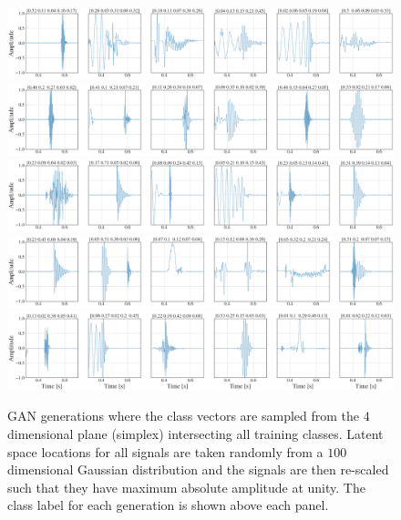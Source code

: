 \documentclass[12pt]{iopart}
\newcommand{\ndimensional}[1]{$#1$\nobreakdash\discretionary{-}{-}{-}dimensional}
\begin{document}
\begin{figure}
    \centering
    \includegraphics[width=\textwidth]{figures/generations/simplex_sample1.png}
    \includegraphics[width=\textwidth]{figures/generations/simplex_sample2.png}
    \includegraphics[width=\textwidth]{figures/generations/simplex_sample3.png}
    \includegraphics[width=\textwidth]{figures/generations/simplex_sample4.png}
    \includegraphics[width=\textwidth]{figures/generations/simplex_sample5.png}
    \caption{GAN generations where the class vectors are sampled from the \ndimensional{4} plane (simplex) intersecting all training classes. Latent space locations for all signals are taken randomly from a \ndimensional{100} Gaussian distribution and the signals are then re-scaled such that they have maximum absolute amplitude at unity. The class label for each generation is shown above each panel.}
    \label{fig:simplexd_samples}
\end{figure}
\end{document}
